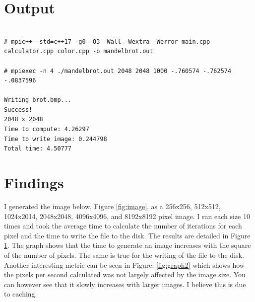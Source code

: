 \documentclass{article}
\begin{document}
\section*{Output}

\begin{lstlisting}[showstringspaces=false]

# mpic++ -std=c++17 -g0 -O3 -Wall -Wextra -Werror main.cpp calculator.cpp color.cpp -o mandelbrot.out

# mpiexec -n 4 ./mandelbrot.out 2048 2048 1000 -.760574 -.762574 -.0837596

Writing brot.bmp...
Success!
2048 x 2048
Time to compute: 4.26297
Time to write image: 0.244798
Total time: 4.50777

\end{lstlisting}

\section*{Findings}

I generated the image below, Figure \ref{fig:image}, as a 256x256, 512x512, 1024x2014, 2048x2048, 4096x4096, and 8192x8192 pixel image. I ran each size 10 times and took the average time to calculate the number of iterations for each pixel and the time to write the file to the disk. The results are detailed in Figure \ref{fig:graph}. The graph shows that the time to generate an image increases with the square of the number of pixels. The same is true for the writing of the file to the disk. Another interesting metric can be seen in Figure: \ref{fig:graph2} which shows how the pixels per second calculated was not largely affected by the image size. You can however see that it slowly increases with larger images. I believe this is due to caching.

\begin{figure}[!htbp]
    \centering
    \caption{}
    \label{fig:graph}
\end{figure}
\end{document}
